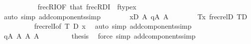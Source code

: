 \begin{isabellebody}
\ \ \ \ \ \ \ \ \isamarkupfalse%
\ \ frecRI{}{\isacharprime}{\kern0pt}{\isacharbrackleft}{\kern0pt}OF\ that{\isacharparenleft}{\kern0pt}{}{\isacharparenright}{\kern0pt}{\isacharbrackright}{\kern0pt}\ frecR{\isacharunderscore}{\kern0pt}DI\ \ {\isacartoucheopen}ftype{\isacharparenleft}{\kern0pt}x{\isacharparenright}{\kern0pt}\ {\isacharequal}{\kern0pt}\ {}{\isacartoucheclose}\ \ \ \ \ \ \ \ \ \ \ \ \ \ \ \ \ \isanewline
\ \ \ \ \ \ \ \ \isamarkupfalse%
\ {\isacharparenleft}{\kern0pt}auto\ simp\ add{\isacharcolon}{\kern0pt}components{\isacharunderscore}{\kern0pt}simp{\isacharparenright}{\kern0pt}\isanewline
\ \ \ \ \ \ \isamarkupfalse%
\ {\isacartoucheopen}x{\isasymin}{\isacharquery}{\kern0pt}D{\isacartoucheclose}\ {\isacartoucheopen}{\isasymsigma}{\isasymin}A{}{\isacartoucheclose}\ {\isacartoucheopen}q{\isasymin}A{}{\isacartoucheclose}\ {\isacartoucheopen}{\isacharquery}{\kern0pt}{\isasymtau}{\isasymin}A{}{\isacartoucheclose}\isanewline
\ \ \ \ \ \ \isamarkupfalse%
\ {\isachardoublequoteopen}{\isasymlangle}{\isacharquery}{\kern0pt}T{\isacharcomma}{\kern0pt}x{\isasymrangle}{\isasymin}\ frecrel{\isacharparenleft}{\kern0pt}{\isacharquery}{\kern0pt}D{\isacharparenright}{\kern0pt}{\isachardoublequoteclose}\ {\isachardoublequoteopen}{\isacharquery}{\kern0pt}T{\isasymin}{\isacharquery}{\kern0pt}D{\isachardoublequoteclose}\isanewline
\ \ \ \ \ \ \ \ \isamarkupfalse%
\ frecrelI{\isacharbrackleft}{\kern0pt}of\ {\isacharquery}{\kern0pt}T\ {\isacharquery}{\kern0pt}D\ x{\isacharbrackright}{\kern0pt}\ \isamarkupfalse%
\ {\isacharparenleft}{\kern0pt}auto\ simp\ add{\isacharcolon}{\kern0pt}components{\isacharunderscore}{\kern0pt}simp{\isacharparenright}{\kern0pt}\isanewline
\ \ \ \ \ \ \isamarkupfalse%
\ {\isacartoucheopen}q{\isasymin}A{}{\isacartoucheclose}\ {\isacartoucheopen}{\isasymsigma}{\isasymin}A{}{\isacartoucheclose}\ {\isacartoucheopen}{\isacharquery}{\kern0pt}{\isasymtau}{\isasymin}A{}{\isacartoucheclose}\ {\isacartoucheopen}{\isacharquery}{\kern0pt}{\isasymtheta}{\isasymin}A{}{\isacartoucheclose}\ {}\isanewline
\ \ \ \ \ \ \isamarkupfalse%
\ {\isacharquery}{\kern0pt}thesis\ \isamarkupfalse%
\ {\isacharparenleft}{\kern0pt}force\ simp\ add{\isacharcolon}{\kern0pt}components{\isacharunderscore}{\kern0pt}simp{\isacharparenright}{\kern0pt}\isanewline
\ \ \ \ \isamarkupfalse%

\end{isabellebody}
